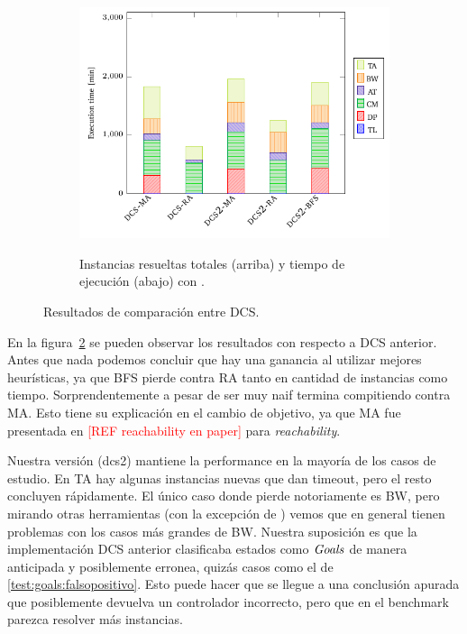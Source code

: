 \begin{figure}[th]
\begin{subfigure}{0.5\textwidth}
        \includegraphics[width=\linewidth]{figures/benchmark/dcs_time.pdf}\label{fig:dcs:results:time}
        \caption{Instancias resueltas totales (arriba) y tiempo de ejecución (abajo) con \DCS.}
    \end{subfigure}
\caption{Resultados de comparación entre DCS.}
\label{fig:dcs:results}
\end{figure}

En la figura~\ref{fig:dcs:results} se pueden observar los resultados con respecto a DCS anterior. Antes que nada podemos concluir que hay una ganancia al utilizar mejores heurísticas, ya que BFS pierde contra RA tanto en cantidad de instancias como tiempo. Sorprendentemente a pesar de ser muy naif termina compitiendo contra MA. Esto tiene su explicación en el cambio de objetivo, ya que MA fue presentada en \textcolor{red}{[REF reachability en paper]} para \textit{reachability}.

Nuestra versión (dcs2) mantiene la performance en la mayoría de los casos de estudio. En TA hay algunas instancias nuevas que dan timeout, pero el resto concluyen rápidamente. El único caso donde pierde notoriamente es BW, pero mirando otras herramientas (con la excepción de \MYND) vemos que en general tienen problemas con los casos más grandes de BW. Nuestra suposición es que la implementación DCS anterior clasificaba estados como $\mathit{Goals}$ de manera anticipada y posiblemente erronea, quizás casos como el de \ref{test:goals:falsopositivo}. Esto puede hacer que se llegue a una conclusión apurada que posiblemente devuelva un controlador incorrecto, pero que en el benchmark parezca resolver más instancias.

